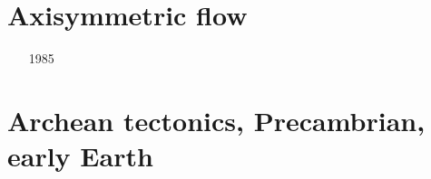 \section{Axisymmetric flow}

\begin{scriptsize}
\begin{itemize}
\item[1985]
\item[\nineteenninetytwo] 
\item[\nineteenninetyseven] 
\item[\twothousandthree] 
\item[\twothousandfour] 
\item[\twothousandseven] 
\item[\twothousandten] 
\item[\twothousandtwelve] 
\end{itemize}
\end{scriptsize}

\section{Archean tectonics, Precambrian, early Earth}

